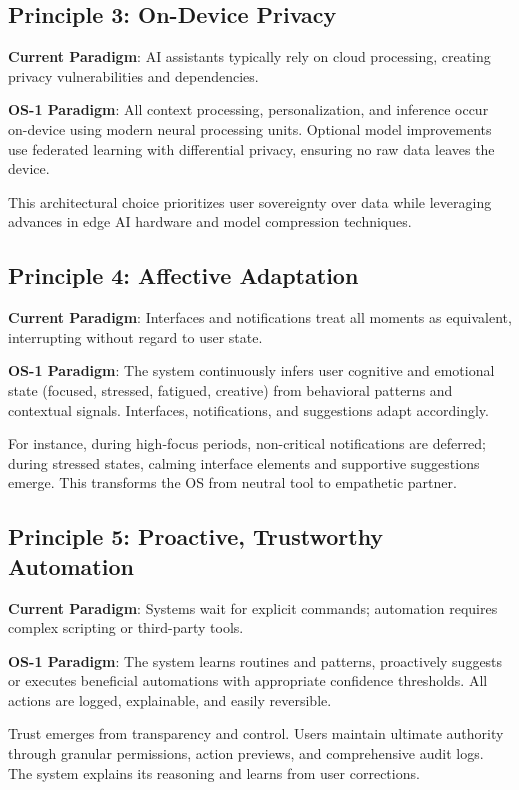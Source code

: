 \documentclass[conference]{IEEEtran}
\begin{document}
\subsection{Principle 3: On-Device Privacy}

\textbf{Current Paradigm}: AI assistants typically rely on cloud processing, creating privacy vulnerabilities and dependencies.

\textbf{OS-1 Paradigm}: All context processing, personalization, and inference occur on-device using modern neural processing units. Optional model improvements use federated learning with differential privacy, ensuring no raw data leaves the device.

This architectural choice prioritizes user sovereignty over data while leveraging advances in edge AI hardware and model compression techniques.

\subsection{Principle 4: Affective Adaptation}

\textbf{Current Paradigm}: Interfaces and notifications treat all moments as equivalent, interrupting without regard to user state.

\textbf{OS-1 Paradigm}: The system continuously infers user cognitive and emotional state (focused, stressed, fatigued, creative) from behavioral patterns and contextual signals. Interfaces, notifications, and suggestions adapt accordingly.

For instance, during high-focus periods, non-critical notifications are deferred; during stressed states, calming interface elements and supportive suggestions emerge. This transforms the OS from neutral tool to empathetic partner.

\subsection{Principle 5: Proactive, Trustworthy Automation}

\textbf{Current Paradigm}: Systems wait for explicit commands; automation requires complex scripting or third-party tools.

\textbf{OS-1 Paradigm}: The system learns routines and patterns, proactively suggests or executes beneficial automations with appropriate confidence thresholds. All actions are logged, explainable, and easily reversible.

Trust emerges from transparency and control. Users maintain ultimate authority through granular permissions, action previews, and comprehensive audit logs. The system explains its reasoning and learns from user corrections.
\end{document}
